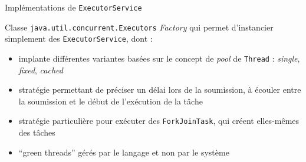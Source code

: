 
\begingroup

\begin{frame}[fragile]{Implémentations de \texttt{ExecutorService}}
  \begin{block}{Classe \lstinline{java.util.concurrent.Executors}}
    \textit{Factory} qui permet d'instancier simplement
    des \lstinline{ExecutorService}, dont :
    \begin{itemize}
    \item {} implante différentes variantes basées sur le concept de \textit{pool} de \lstinline{Thread} : \textit{single}, \textit{fixed}, \textit{cached}
    \item {} stratégie permettant de préciser un délai lors de la soumission, à écouler entre la soumission et le début de l'exécution de la tâche
    \item {} stratégie particulière pour exécuter des \lstinline{ForkJoinTask}, qui créent elles-mêmes des tâches
    \item {} ``green threads'' gérés par le langage et non par le système
    \end{itemize}
  \end{block}
\end{frame}

\endgroup
\endinput
